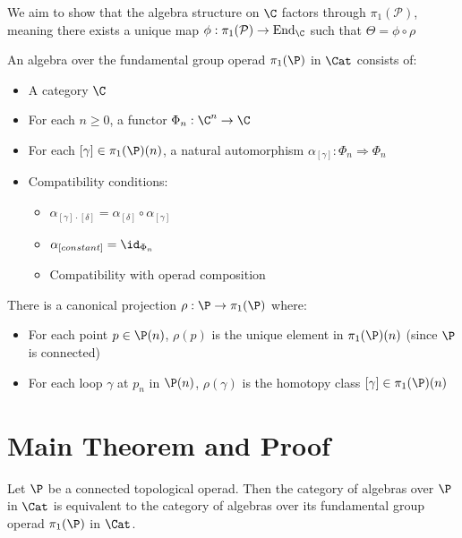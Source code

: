We aim to show that the algebra structure on $\C$ factors through $\pi_1(\mathcal{P})$, meaning there exists a unique map $\phi: \pi_1(\mathcal{P}) \to \text{End}_{\C}$ such that $\Theta = \phi \circ \rho$



\begin{defin}
An algebra over the fundamental group operad $\pi_1(\P)$ in $\Cat$ consists of:
\begin{itemize}
    \item A category $\C$
    \item For each $n \geq 0$, a functor $\Phi_n: \C^n \to \C$
    \item For each $[\gamma] \in \pi_1(\P)(n)$, a natural automorphism $\alpha_{[\gamma]}: \Phi_n \Rightarrow \Phi_n$
    \item Compatibility conditions:
    \begin{itemize}
        \item $\alpha_{[\gamma] \cdot [\delta]} = \alpha_{[\delta]} \circ \alpha_{[\gamma]}$
        \item $\alpha_{[constant]} = \id_{\Phi_n}$
        \item Compatibility with operad composition
    \end{itemize}
\end{itemize}
\end{defin}

There is a canonical projection $\rho: \P \to \pi_1(\P)$ where:
\begin{itemize}
    \item For each point $p \in \P(n)$, $\rho(p)$ is the unique element in $\pi_1(\P)(n)$ (since $\P$ is connected)
    \item For each loop $\gamma$ at $p_n$ in $\P(n)$, $\rho(\gamma)$ is the homotopy class $[\gamma] \in \pi_1(\P)(n)$
\end{itemize}

\section{Main Theorem and Proof}

\begin{prop}
Let $\P$ be a connected topological operad. Then the category of algebras over $\P$ in $\Cat$ is equivalent to the category of algebras over its fundamental group operad $\pi_1(\P)$ in $\Cat$.
\end{prop}

